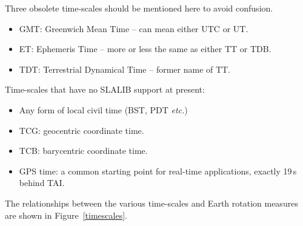 \documentclass[11pt,fleqn,twoside]{article}
\renewcommand{\_}{{\tt\char'137}}     %
\begin{document}
Three obsolete time-scales should be mentioned here to avoid confusion.
\begin{itemize}
\item GMT: Greenwich Mean Time -- can mean either UTC or UT.
\item ET: Ephemeris Time -- more or less the same as either TT or TDB.
\item TDT: Terrestrial Dynamical Time -- former name of TT.
\end{itemize}

Time-scales that have no SLALIB support at present:
\begin{itemize}
\item Any form of local civil time (BST, PDT {\it etc.})
\item TCG: geocentric coordinate time.
\item TCB: barycentric coordinate time.
\item GPS time: a common starting point for real-time applications,
      exactly 19\,s behind TAI.
\end{itemize}

The relationships between the various time-scales and Earth rotation
measures are shown in Figure~\ref{timescales}.
\end{document}
